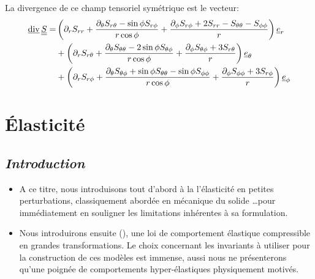 \documentclass[10pt]{book}
\begin{document}
\begin{appendices}
La divergence de ce champ tensoriel symétrique est le vecteur:
\begin{equation}
\begin{aligned}
\vdiv\ten{S}=&\left(\partial_{r}S_{rr}+\frac{\partial_{\theta}S_{r\theta}-\sin\phi S_{r\phi}}{r\cos\phi}+\frac{\partial_{\phi}S_{r\phi}+2S_{rr}-S_{\theta\theta}-S_{\phi\phi}}{r}\right)\er\\
&+\left(\partial_{r}S_{r\theta}+\frac{\partial_{\theta}S_{\theta\theta}-2\sin\phi S_{\theta\phi}}{r\cos\phi}+\frac{\partial_{\phi}S_{\theta\phi}+3S_{r\theta}}{r}\right)\etheta\\
&+\left(\partial_{r}S_{r\phi}+\frac{\partial_{\theta}S_{\theta\phi}+\sin\phi S_{\theta\theta}-\sin\phi S_{\phi\phi}}{r\cos\phi}+\frac{\partial_{\phi}S_{\phi\phi}+3S_{r\phi}}{r}\right)\e_{\phi}
\end{aligned}
\label{eq:formulaire_div_sph_ten}
\end{equation}
\chapter{Élasticité}\label{Chapitre:Elasticité}
\section*{\emph{Introduction}}
\begin{itemize}[label=$\star$]
\item A ce titre, nous introduisons tout d'abord à la  l'élasticité en petites perturbations, classiquement abordée en mécanique du solide \ldots pour immédiatement en souligner les limitations inhérentes à sa formulation.
\item Nous introduirons ensuite (), une loi de comportement élastique compressible en grandes transformations. Le choix concernant les invariants à utiliser pour la construction de ces modèles est immense, aussi nous ne présenterons qu'une poignée de comportements hyper-élastiques physiquement motivés.
\end{itemize}

\end{appendices}
\end{document}
